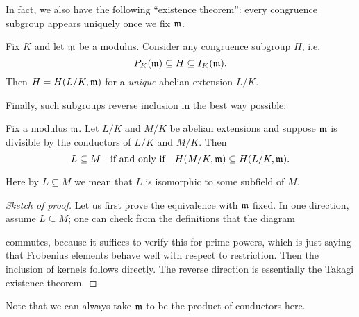 In fact, we also have the following ``existence theorem'':
every congruence subgroup appears uniquely once we fix $\mathfrak m$.
\begin{theorem}
	Fix $K$ and let $\mathfrak m$ be a modulus. 
	Consider any congruence subgroup $H$, i.e.\
	\[ P_K(\mathfrak m) \subseteq H \subseteq I_K(\mathfrak m). \]
	Then $H = H(L/K, \mathfrak m)$ for a \emph{unique} abelian extension $L/K$.
\end{theorem}

Finally, such subgroups reverse inclusion in the best way possible:
\begin{lemma}
	Fix a modulus $\mathfrak m$.
	Let $L/K$ and $M/K$ be abelian extensions 
	and suppose $\mathfrak m$ is divisible by the conductors of $L/K$ and $M/K$.
	Then 
	\[ L \subseteq M
		\quad\text{if and only if}\quad
		H(M/K, \mathfrak m) \subseteq H(L/K, \mathfrak m).  \]
\end{lemma}
Here by $L \subseteq M$ we mean that $L$ is isomorphic to some subfield of $M$.
\begin{proof}
	[Sketch of proof]
	Let us first prove the equivalence with $\mathfrak m$ fixed.
	In one direction, assume $L \subseteq M$;
	one can check from the definitions that the diagram
	\begin{center}
	\end{center}
	commutes, because it suffices to verify this for prime powers,
	which is just saying that Frobenius elements behave well
	with respect to restriction.
	Then the inclusion of kernels follows directly.
	The reverse direction is essentially the Takagi existence theorem.
\end{proof}
Note that we can always take $\mathfrak m$ to be the product of conductors here.

\bigskip

